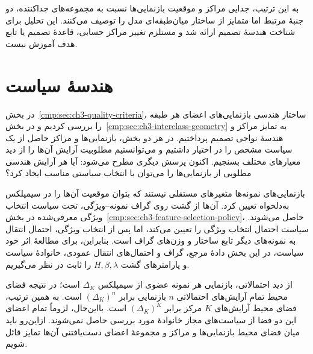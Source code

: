 به این ترتیب، جدایی مراکز و موقعیت بازنمایی‌ها
نسبت به مجموعه‌های جداکننده، دو جنبهٔ مرتبط
اما متمایز از ساختار میان‌طبقه‌ای مدل را توصیف
می‌کنند. این تحلیل برای شناخت هندسهٔ تصمیم
ارائه شد و مستلزم تغییر مراکز حسابی، قاعدهٔ
تصمیم یا تابع هدف آموزش نیست.

\section{هندسهٔ سیاست}
\label{cmp:sec:ch3-policy-geometry}

در بخش~\ref{cmp:sec:ch3-quality-criteria}، ساختار
هندسی بازنمایی‌های اعضای هر طبقه را بررسی کردیم و در
بخش~\ref{cmp:sec:ch3-interclass-geometry} به تمایز
مراکز و هندسهٔ نواحی تصمیم پرداختیم. در هر دو بخش،
بازنمایی‌ها و مراکز حاصل از یک سیاست مشخص را در
اختیار داشتیم و می‌توانستیم مطلوبیت آرایش آن‌ها را
از دید معیارهای مختلف بسنجیم. اکنون پرسش دیگری
مطرح می‌شود: آیا هر آرایش هندسی مطلوبی از
بازنمایی‌ها را می‌توان با انتخاب سیاستی مناسب
ایجاد کرد؟

بازنمایی‌های نمونه‌ها متغیرهای مستقلی نیستند که
بتوان موقعیت آن‌ها را در سیمپلکس به‌دلخواه تعیین
کرد. آن‌ها از گشت روی گراف نمونه--ویژگی، تحت
سیاست انتخاب ویژگی معرفی‌شده در
بخش~\ref{cmp:sec:ch3-feature-selection-policy}،
حاصل می‌شوند. سیاست احتمال انتخاب ویژگی را
تعیین می‌کند، اما پس از انتخاب ویژگی، احتمال
انتقال به نمونه‌های دیگر تابع ساختار و وزن‌های
گراف است. بنابراین، برای مطالعهٔ اثر خود سیاست،
در این بخش دادهٔ مرجع، گراف و احتمال‌های انتقال
عمودی، خانوادهٔ سیاست و پارامترهای گشت
$H,\beta,\lambda$ را ثابت در نظر می‌گیریم.

از دید احتمالاتی، بازنمایی هر نمونه عضوی از
سیمپلکس $\Delta_K$ است؛ در نتیجه فضای محیط
تمام آرایش‌های احتمالاتی $n$ بازنمایی برابر
$(\Delta_K)^n$ است. به همین ترتیب، فضای محیط
آرایش‌های $K$ مرکز برابر $(\Delta_K)^K$ است.
بااین‌حال، لزوماً تمام اعضای این دو فضا از
سیاست‌های مجاز خانوادهٔ مورد بررسی حاصل
نمی‌شوند. ازاین‌رو باید میان فضای محیط
بازنمایی‌ها و مراکز و مجموعهٔ اعضای دست‌یافتنی
آن‌ها تمایز قائل شویم.

